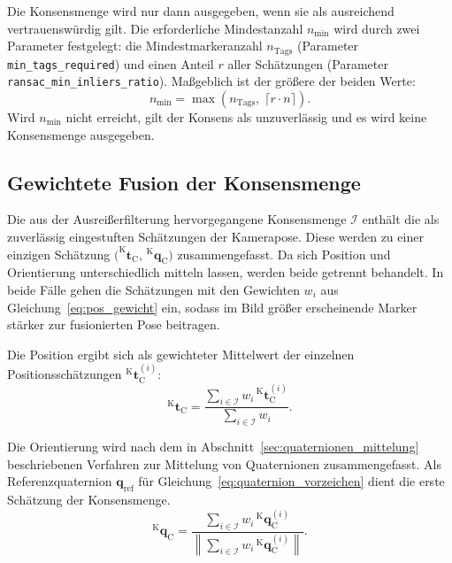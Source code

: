 Die Konsensmenge wird nur dann ausgegeben, wenn sie als ausreichend vertrauenswürdig gilt.
Die erforderliche Mindestanzahl $n_{\min}$ wird durch zwei Parameter festgelegt: die 
Mindestmarkeranzahl $n_{\mathrm{Tags}}$ (Parameter \texttt{min\_tags\_required}) und einen Anteil $r$ aller 
Schätzungen (Parameter \texttt{ransac\_min\_inliers\_ratio}).
Maßgeblich ist der größere der beiden Werte:
\begin{equation}
n_{\min} = \max\!\left(n_{\mathrm{Tags}},\; \lceil r \cdot n \rceil\right).
\label{eq:pos_ransac_konsens}
\end{equation}
Wird $n_{\min}$ nicht erreicht, gilt der Konsens als unzuverlässig und es wird keine Konsensmenge ausgegeben.



\subsection{Gewichtete Fusion der Konsensmenge}
\label{subsec:pos_fusion}
Die aus der Ausreißerfilterung hervorgegangene Konsensmenge $\mathcal{I}$ enthält die als zuverlässig eingestuften Schätzungen der Kamerapose.
Diese werden zu einer einzigen Schätzung $\bigl(^{\mathrm{K}}\mathbf{t}_{\mathrm{C}},\,{^{\mathrm{K}}\mathbf{q}_{\mathrm{C}}}\bigr)$ zusammengefasst.
Da sich Position und Orientierung unterschiedlich mitteln lassen, werden beide getrennt behandelt.
In beide Fälle gehen die Schätzungen mit den Gewichten $w_i$ aus Gleichung~\eqref{eq:pos_gewicht} ein, sodass im Bild größer erscheinende Marker stärker zur fusionierten Pose beitragen.

Die Position ergibt sich als gewichteter Mittelwert der einzelnen Positionsschätzungen $^{\mathrm{K}}\mathbf{t}_{\mathrm{C}}^{(i)}$:
\begin{equation}
^{\mathrm{K}}\mathbf{t}_{\mathrm{C}} = \frac{\displaystyle\sum_{i \in \mathcal{I}} w_i \, {^{\mathrm{K}}\mathbf{t}_{\mathrm{C}}^{(i)}}}{\displaystyle\sum_{i \in \mathcal{I}} w_i}.
\label{eq:pos_fusion_t}
\end{equation}

Die Orientierung wird nach dem in Abschnitt~\ref{sec:quaternionen_mittelung} beschriebenen Verfahren zur Mittelung von Quaternionen zusammengefasst.
Als Referenzquaternion $\mathbf{q}_{\mathrm{ref}}$ für Gleichung~\eqref{eq:quaternion_vorzeichen} dient die erste Schätzung der Konsensmenge.
\begin{equation}
^{\mathrm{K}}\mathbf{q}_{\mathrm{C}} = \frac{\displaystyle\sum_{i \in \mathcal{I}} w_i \, {^{\mathrm{K}}\mathbf{q}_{\mathrm{C}}^{(i)}}}{\left\lVert \displaystyle\sum_{i \in \mathcal{I}} w_i \, {^{\mathrm{K}}\mathbf{q}_{\mathrm{C}}^{(i)}} \right\rVert}.
\label{eq:pos_fusion_q}
\end{equation}

